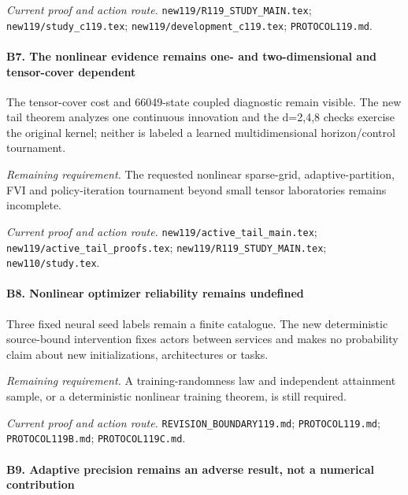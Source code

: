 \par\emph{Current proof and action route.} \nolinkurl{new119/R119_STUDY_MAIN.tex}; \nolinkurl{new119/study_c119.tex}; \nolinkurl{new119/development_c119.tex}; \nolinkurl{PROTOCOL119.md}.

\paragraph{B7. The nonlinear evidence remains one- and two-dimensional and tensor-cover dependent}

The tensor-cover cost and 66049-state coupled diagnostic remain visible. The new tail theorem analyzes one continuous innovation and the d=2,4,8 checks exercise the original kernel; neither is labeled a learned multidimensional horizon/\allowbreak{}control tournament.

\par\emph{Remaining requirement.} The requested nonlinear sparse-grid, adaptive-partition, FVI and policy-iteration tournament beyond small tensor laboratories remains incomplete.

\par\emph{Current proof and action route.} \nolinkurl{new119/active_tail_main.tex}; \nolinkurl{new119/active_tail_proofs.tex}; \nolinkurl{new119/R119_STUDY_MAIN.tex}; \nolinkurl{new110/study.tex}.

\paragraph{B8. Nonlinear optimizer reliability remains undefined}

Three fixed neural seed labels remain a finite catalogue. The new deterministic source-bound intervention fixes actors between services and makes no probability claim about new initializations, architectures or tasks.

\par\emph{Remaining requirement.} A training-randomness law and independent attainment sample, or a deterministic nonlinear training theorem, is still required.

\par\emph{Current proof and action route.} \nolinkurl{REVISION_BOUNDARY119.md}; \nolinkurl{PROTOCOL119.md}; \nolinkurl{PROTOCOL119B.md}; \nolinkurl{PROTOCOL119C.md}.

\paragraph{B9. Adaptive precision remains an adverse result, not a numerical contribution}

